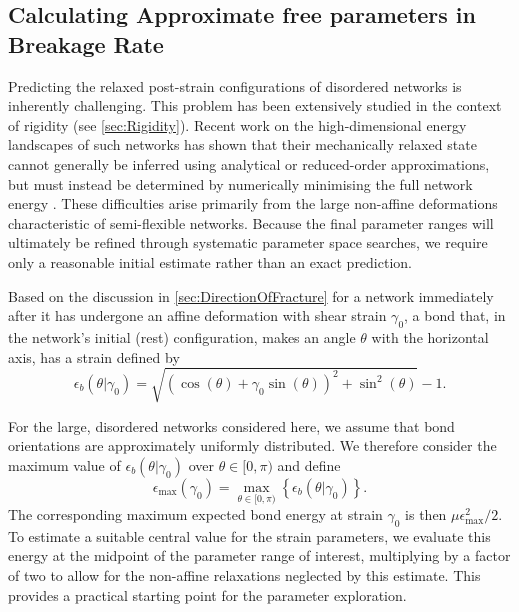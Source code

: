 \newpage
\begin{subappendices}

\section{Calculating Approximate free parameters in Breakage Rate} \label{sec:approxEx}
Predicting the relaxed post-strain configurations of disordered networks is inherently challenging. This problem has been extensively studied in the context of rigidity (see \cref{sec:Rigidity}). Recent work on the high-dimensional energy landscapes of such networks has shown that their mechanically relaxed state cannot generally be inferred using analytical or reduced-order approximations, but must instead be determined by numerically minimising the full network energy \cite{damavandi_energetic_2022,damavandi_energetic_2022-1}. These difficulties arise primarily from the large non-affine deformations characteristic of semi-flexible networks. Because the final parameter ranges will ultimately be refined through systematic parameter space searches, we require only a reasonable initial estimate rather than an exact prediction.

Based on the discussion in \cref{sec:DirectionOfFracture} for a network immediately after it has undergone an affine deformation with shear strain $\gamma_0$, a bond that, in the network’s initial (rest) configuration, makes an angle $\theta$ with the horizontal axis, has a strain defined by
\begin{equation*}
     \epsilon_b(\theta| \gamma_0) = \sqrt{(\cos(\theta) + \gamma_0\sin(\theta))^2 + \sin^2(\theta)} - 1.
\end{equation*}

For the large, disordered networks considered here, we assume that bond orientations are approximately uniformly distributed. We therefore consider the maximum value of $\epsilon_b(\theta|\gamma_0)$ over $\theta \in [0,\pi)$ and define
\begin{equation}
\epsilon_{\max}(\gamma_0) = \max_{\theta \in [0,\pi)} \left\{ \epsilon_b(\theta|\gamma_0) \right\}.
\end{equation}
The corresponding maximum expected bond energy at strain $\gamma_0$ is then $\mu \epsilon_{\max}^2/2$. To estimate a suitable central value for the strain parameters, we evaluate this energy at the midpoint of the parameter range of interest, multiplying by a factor of two to allow for the non-affine relaxations neglected by this estimate. This provides a practical starting point for the parameter exploration.


\end{subappendices}
